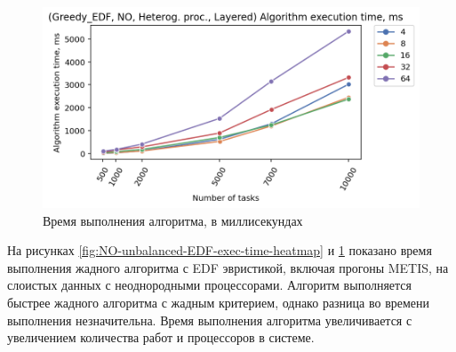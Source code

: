 \begin{figure}[!htbp]
    \centering
    \includegraphics[width=\textwidth]{imgs/unbalanced/NO_EDF/tr_graph.png}
    \caption{Время выполнения алгоритма, в миллисекундах}
    \label{fig:NO-unbalanced-EDF-exec-time-compiled}
\end{figure}

На рисунках \ref{fig:NO-unbalanced-EDF-exec-time-heatmap} и \ref{fig:NO-unbalanced-EDF-exec-time-compiled} показано время выполнения жадного алгоритма с EDF эвристикой, включая прогоны METIS, на слоистых данных с неоднородными процессорами. Алгоритм выполняется быстрее жадного алгоритма с жадным критерием, однако разница во времени выполнения незначительна. Время выполнения алгоритма увеличивается с увеличением количества работ и процессоров в системе.